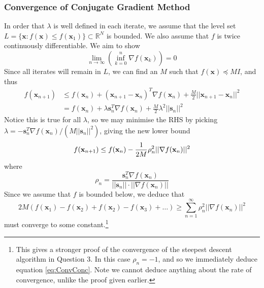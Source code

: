 \documentclass[10pt,a4paper,notitlepage]{article}
\newcommand{\abs}[1]{\lvert#1\rvert}
\newcommand{\R}{\mathbb{R}}
\newcommand{\x}{\mathbf{x}}
\newcommand{\s}{\mathbf{s}}
\begin{document}
\subsubsection*{\centering Convergence of Conjugate Gradient Method}
In order that $\lambda$ is well defined in each iterate, we assume that the level set $L=\lbrace \x : f(\x)\leq f(\x_{1})\rbrace \subset \R^{N}$ is bounded. We also assume that $f$ is twice continuously differentiable. We aim to show
\begin{equation}\label{eq:ConvConc}
\lim_{n\rightarrow \infty}\left(\inf_{k=0}^{n}\nabla f(\x_{k})\right)=0
\end{equation}
Since all iterates will remain in $L$, we can find an $M$ such that $f(\x)\preceq MI$, and thus
\begin{equation}
\begin{aligned}
f(\x_{n+1}) &\leq f(\x_{n})+(\x_{n+1}-\x_{n})^{T}\nabla f(\x_{n})+\frac{M}{2}\abs{\abs{\x_{n+1}-\x_{n}}}^{2}\\
&= f(\x_{n})+\lambda \s_{n}^{T}\nabla f(\x_{n})+\frac{M}{2}\lambda^{2}\abs{\abs{\s_{n}}}^{2}
\end{aligned}
\end{equation}
Notice this is true for all $\lambda$, so we may minimise the RHS by picking $\lambda=-\s_{n}^{T}\nabla f(\x_{n})/(M\abs{\abs{\s_{n}}}^{2})$, giving the new lower bound 
\begin{equation}
f(\x_{n+1}) \leq f(\x_{n})-\frac{1}{2M}\rho_{n}^{2}\abs{\abs{\nabla f(\x_{n})}}^{2}\\
\end{equation}
where \begin{equation}
\rho_{n}=\frac{\s_{n}^{T}\nabla f(\x_{n})}{\abs{\abs{\s_{n}}}\cdot \abs{\abs{\nabla f(\x_{n})}}}
\end{equation}
Since we assume that $f$ is bounded below, we deduce that 
\begin{equation}\label{eq:sumConv}
2M\left(f(\x_{1})-f(\x_{2})+f(\x_{2})-f(\x_{3})+\hdots\right) \geq \sum_{n=1}^{\infty}\rho_{n}^{2}\abs{\abs{\nabla f(\x_{n})}}^{2}
\end{equation}
must converge to some constant.\footnote{This gives a stronger proof of the convergence of the steepest descent algorithm in Question 3. In this case $\rho_{n}=-1$, and so we immediately deduce equation \eqref{eq:ConvConc}. Note we cannot deduce anything about the rate of convergence, unlike the proof given earlier.}\\
\end{document}
